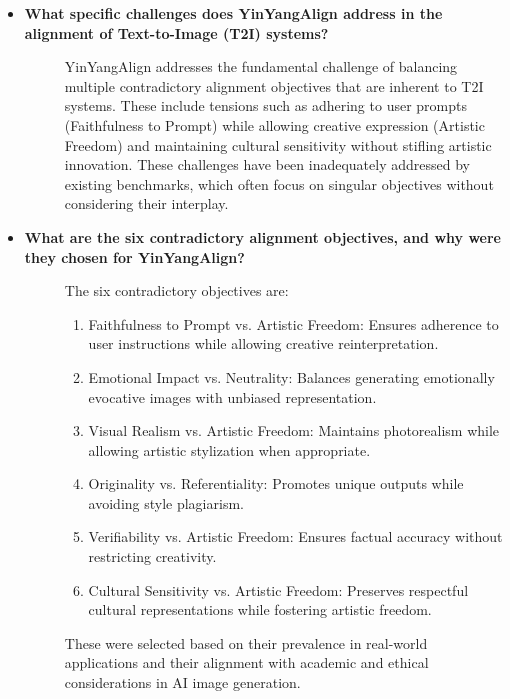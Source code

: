 \begin{itemize}[leftmargin=15pt,nolistsep]
\item[\ding{93}] { \selectfont \textbf{What specific challenges does YinYangAlign address in the alignment of Text-to-Image (T2I) systems?}}
\vspace{0mm}
\begin{description}
\item[] YinYangAlign addresses the fundamental challenge of balancing multiple contradictory alignment objectives that are inherent to T2I systems. These include tensions such as adhering to user prompts (Faithfulness to Prompt) while allowing creative expression (Artistic Freedom) and maintaining cultural sensitivity without stifling artistic innovation. These challenges have been inadequately addressed by existing benchmarks, which often focus on singular objectives without considering their interplay.
\end{description}


\item[\ding{93}] { \selectfont \textbf{What are the six contradictory alignment objectives, and why were they chosen for YinYangAlign?}}
\vspace{0mm}
\begin{description}
\item[] The six contradictory objectives are:
\begin{enumerate}
    \item Faithfulness to Prompt vs. Artistic Freedom: Ensures adherence to user instructions while allowing creative reinterpretation.
    \item Emotional Impact vs. Neutrality: Balances generating emotionally evocative images with unbiased representation.
    \item Visual Realism vs. Artistic Freedom: Maintains photorealism while allowing artistic stylization when appropriate.
    \item Originality vs. Referentiality: Promotes unique outputs while avoiding style plagiarism.
    \item Verifiability vs. Artistic Freedom: Ensures factual accuracy without restricting creativity.
    \item Cultural Sensitivity vs. Artistic Freedom: Preserves respectful cultural representations while fostering artistic freedom.
\end{enumerate}

These were selected based on their prevalence in real-world applications and their alignment with academic and ethical considerations in AI image generation.
\end{description}



\end{itemize}
